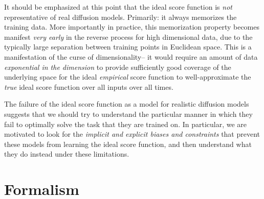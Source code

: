\documentclass{article}
\theoremstyle{plain}
\theoremstyle{definition}
\theoremstyle{remark}
\begin{document}
It should be emphasized at this point that the ideal score function is \textit{not} representative of real diffusion models. Primarily: it always memorizes the training data. More importantly in practice, this memorization property becomes manifest \textit{very early} in the reverse process for high dimensional data, due to the typically large separation between training points in Euclidean space. This is a manifestation of the curse of dimensionality– it would require an amount of data \textit{exponential in the dimension} to provide sufficiently good coverage of the underlying space for the ideal \textit{empirical} score function to well-approximate the \textit{true} ideal score function over all inputs over all times.

The failure of the ideal score function as a model for realistic diffusion models suggests that we should try to understand the particular manner in which they fail to optimally solve the task that they are trained on. In particular, we are motivated to look for the \textit{implicit and explicit biases and constraints} that prevent these models from learning the ideal score function, and then understand what they do instead under these limitations.





\section{Formalism}\label{app:proofs}
\end{document}
